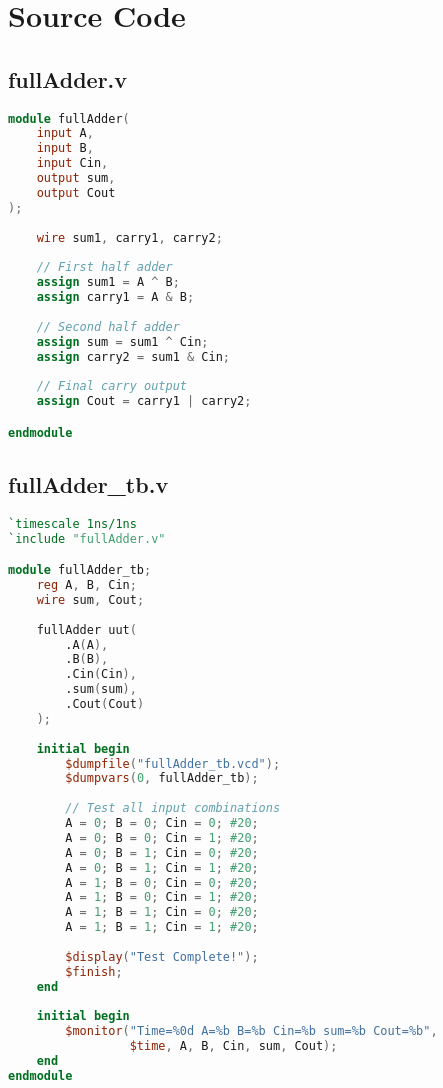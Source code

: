 \documentclass[a4paper,12pt]{article}
\begin{document}
\newpage

\section*{Source Code}
\subsection*{fullAdder.v}
\begin{lstlisting}[language=Verilog]
module fullAdder(
    input A,
    input B,
    input Cin,
    output sum,
    output Cout
);
    
    wire sum1, carry1, carry2;
    
    // First half adder
    assign sum1 = A ^ B;
    assign carry1 = A & B;
    
    // Second half adder
    assign sum = sum1 ^ Cin;
    assign carry2 = sum1 & Cin;
    
    // Final carry output
    assign Cout = carry1 | carry2;

endmodule
\end{lstlisting}

\newpage

\subsection*{fullAdder\_tb.v}
\begin{lstlisting}[language=Verilog]
`timescale 1ns/1ns
`include "fullAdder.v"

module fullAdder_tb;
    reg A, B, Cin;
    wire sum, Cout;
    
    fullAdder uut(
        .A(A),
        .B(B),
        .Cin(Cin),
        .sum(sum),
        .Cout(Cout)
    );
    
    initial begin
        $dumpfile("fullAdder_tb.vcd");
        $dumpvars(0, fullAdder_tb);
        
        // Test all input combinations
        A = 0; B = 0; Cin = 0; #20;
        A = 0; B = 0; Cin = 1; #20;
        A = 0; B = 1; Cin = 0; #20;
        A = 0; B = 1; Cin = 1; #20;
        A = 1; B = 0; Cin = 0; #20;
        A = 1; B = 0; Cin = 1; #20;
        A = 1; B = 1; Cin = 0; #20;
        A = 1; B = 1; Cin = 1; #20;
        
        $display("Test Complete!");
        $finish;
    end
    
    initial begin
        $monitor("Time=%0d A=%b B=%b Cin=%b sum=%b Cout=%b",
                 $time, A, B, Cin, sum, Cout);
    end
endmodule
\end{lstlisting}
\end{document}
